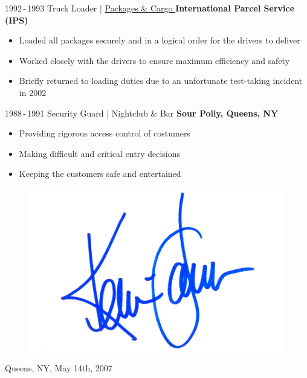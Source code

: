 \documentclass[]{friggeri-cv-theme}
\begin{document}
\begin{entrylist}
  \entry
    {1992\,-\,1993\enspace}
    {Truck Loader | }{\href{https://kingofqueens.fandom.com/de/wiki/International_Parcel_Service}{\small Packages \& Cargo \faMousePointer}}
    {\normalsize\textbf{\color{ipsgreen}\faMapMarker\space International Parcel Service (IPS)}}
    {\jobspace
    \begin{itemize}[leftmargin=*, noitemsep]
    \item Loaded all packages securely and in a logical order for the drivers to deliver
    \item Worked closely with the drivers to ensure maximum efficiency and safety
    \item Briefly returned to loading duties due to an unfortunate test-taking incident in 2002 \\
    \end{itemize}
    }

  \entry
    {1988\,-\,1991\enspace}
    {Security Guard  | }{\small Nightclub \& Bar}
    {\normalsize\textbf{\color{ipsgreen}\faMapMarker\space Sour Polly, Queens, NY}}
    {\jobspace
    \begin{itemize}[leftmargin=*, itemsep = 0.1em]
    \item Providing rigorous access control of costumers
    \item Making difficult and critical entry decisions
    \item Keeping the customers safe and entertained\\
    \end{itemize}
    }
    
\end{entrylist}

\vspace{-12.5mm}
\begin{figure}[H]
\hspace{11cm}
\includegraphics[scale=0.5]{img/KevinJamesSignature.jpg}
\end{figure}
\vspace{-1.05cm}
\hspace{6.5cm} Queens, NY, May 14th, 2007
\end{document}
